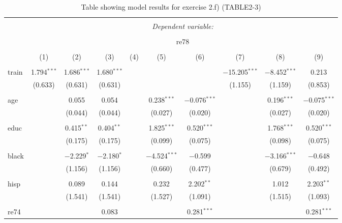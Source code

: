 
\begin{table}[!htbp] \centering 
  \caption{Table showing model results for exercise 2.f) (TABLE2-3)} 
  \label{} 
\begin{tabular}{@{\extracolsep{5pt}}lccccccccc} 
\\[-1.8ex]\hline 
\hline \\[-1.8ex] 
 & \multicolumn{9}{c}{\textit{Dependent variable:}} \\ 
\cline{2-10} 
\\[-1.8ex] & \multicolumn{9}{c}{re78} \\ 
\\[-1.8ex] & (1) & (2) & (3) & (4) & (5) & (6) & (7) & (8) & (9)\\ 
\hline \\[-1.8ex] 
 train & 1.794$^{***}$ & 1.686$^{***}$ & 1.680$^{***}$ &  &  &  & $-$15.205$^{***}$ & $-$8.452$^{***}$ & 0.213 \\ 
  & (0.633) & (0.631) & (0.631) &  &  &  & (1.155) & (1.159) & (0.853) \\ 
  & & & & & & & & & \\ 
 age &  & 0.055 & 0.054 &  & 0.238$^{***}$ & $-$0.076$^{***}$ &  & 0.196$^{***}$ & $-$0.075$^{***}$ \\ 
  &  & (0.044) & (0.044) &  & (0.027) & (0.020) &  & (0.027) & (0.020) \\ 
  & & & & & & & & & \\ 
 educ &  & 0.415$^{**}$ & 0.404$^{**}$ &  & 1.825$^{***}$ & 0.520$^{***}$ &  & 1.768$^{***}$ & 0.520$^{***}$ \\ 
  &  & (0.175) & (0.175) &  & (0.099) & (0.075) &  & (0.098) & (0.075) \\ 
  & & & & & & & & & \\ 
 black &  & $-$2.229$^{*}$ & $-$2.180$^{*}$ &  & $-$4.524$^{***}$ & $-$0.599 &  & $-$3.166$^{***}$ & $-$0.648 \\ 
  &  & (1.156) & (1.156) &  & (0.660) & (0.477) &  & (0.679) & (0.492) \\ 
  & & & & & & & & & \\ 
 hisp &  & 0.089 & 0.144 &  & 0.232 & 2.202$^{**}$ &  & 1.012 & 2.203$^{**}$ \\ 
  &  & (1.541) & (1.541) &  & (1.527) & (1.091) &  & (1.515) & (1.093) \\ 
  & & & & & & & & & \\ 
 re74 &  &  & 0.083 &  &  & 0.281$^{***}$ &  &  & 0.281$^{***}$ \\ 

\end{tabular}
\end{table}
